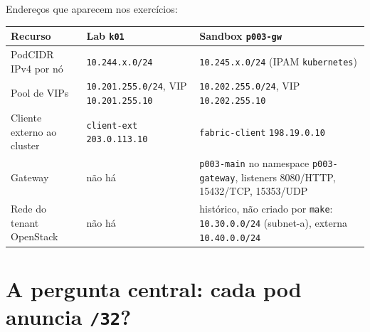 \documentclass[12pt,openany,oneside,a4paper,chapter=TITLE,english,brazil]{abntex2}
\begin{document}
Endereços que aparecem nos exercícios:

\begin{quadro}[!htbp]
\caption{Endereços usados nos exercícios}
\footnotesize
\begin{tabularx}{\textwidth}{|>{\raggedright\arraybackslash\hsize=1.013\hsize}X|>{\raggedright\arraybackslash\hsize=0.487\hsize}X|>{\raggedright\arraybackslash\hsize=1.500\hsize}X|}
\hline
\textbf{Recurso} & \textbf{Lab \texttt{k01}} & \textbf{Sandbox \texttt{p003-{}\allowbreak{}gw}} \\
\hline
PodCIDR IPv4 por nó & \texttt{10.\allowbreak{}244.\allowbreak{}x.\allowbreak{}0/\allowbreak{}24} & \texttt{10.\allowbreak{}245.\allowbreak{}x.\allowbreak{}0/\allowbreak{}24}
(IPAM \texttt{kubernetes}) \\
\hline
Pool de VIPs & \texttt{10.\allowbreak{}201.\allowbreak{}255.\allowbreak{}0/\allowbreak{}24},
VIP \texttt{10.\allowbreak{}201.\allowbreak{}255.\allowbreak{}10} & \texttt{10.\allowbreak{}202.\allowbreak{}255.\allowbreak{}0/\allowbreak{}24},
VIP \texttt{10.\allowbreak{}202.\allowbreak{}255.\allowbreak{}10} \\
\hline
Cliente externo ao cluster & \texttt{client-{}\allowbreak{}ext}
\texttt{203.\allowbreak{}0.\allowbreak{}113.\allowbreak{}10} & \texttt{fabric-{}\allowbreak{}client}
\texttt{198.\allowbreak{}19.\allowbreak{}0.\allowbreak{}10} \\
\hline
Gateway & não há & \texttt{p003-{}\allowbreak{}main} no namespace
\texttt{p003-{}\allowbreak{}gateway}, listeners 8080/HTTP, 15432/TCP,
15353/UDP \\
\hline
Rede do tenant OpenStack & não há & histórico, não criado por \texttt{make}:
\texttt{10.\allowbreak{}30.\allowbreak{}0.\allowbreak{}0/\allowbreak{}24}
(subnet-a), externa
\texttt{10.\allowbreak{}40.\allowbreak{}0.\allowbreak{}0/\allowbreak{}24} \\
\hline
\end{tabularx}
\end{quadro}

\FloatBarrier

\section*{\texorpdfstring{A pergunta central: cada pod anuncia \texttt{/\allowbreak{}32}?}{A pergunta central: cada pod anuncia ?}}\label{a-pergunta-central-cada-pod-anuncia-32}
\end{document}
